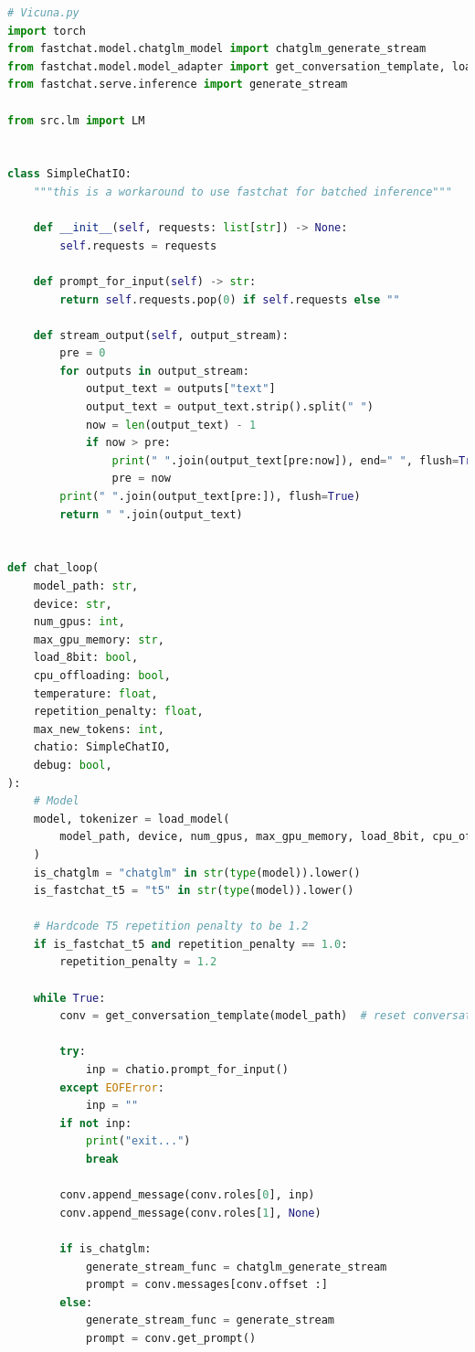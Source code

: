 \documentclass[a4paper,12pt]{article}
\begin{document}
\begin{lstlisting}[language=Python]
# Vicuna.py
import torch
from fastchat.model.chatglm_model import chatglm_generate_stream
from fastchat.model.model_adapter import get_conversation_template, load_model
from fastchat.serve.inference import generate_stream

from src.lm import LM


class SimpleChatIO:
    """this is a workaround to use fastchat for batched inference"""

    def __init__(self, requests: list[str]) -> None:
        self.requests = requests

    def prompt_for_input(self) -> str:
        return self.requests.pop(0) if self.requests else ""

    def stream_output(self, output_stream):
        pre = 0
        for outputs in output_stream:
            output_text = outputs["text"]
            output_text = output_text.strip().split(" ")
            now = len(output_text) - 1
            if now > pre:
                print(" ".join(output_text[pre:now]), end=" ", flush=True)
                pre = now
        print(" ".join(output_text[pre:]), flush=True)
        return " ".join(output_text)


def chat_loop(
    model_path: str,
    device: str,
    num_gpus: int,
    max_gpu_memory: str,
    load_8bit: bool,
    cpu_offloading: bool,
    temperature: float,
    repetition_penalty: float,
    max_new_tokens: int,
    chatio: SimpleChatIO,
    debug: bool,
):
    # Model
    model, tokenizer = load_model(
        model_path, device, num_gpus, max_gpu_memory, load_8bit, cpu_offloading, debug
    )
    is_chatglm = "chatglm" in str(type(model)).lower()
    is_fastchat_t5 = "t5" in str(type(model)).lower()

    # Hardcode T5 repetition penalty to be 1.2
    if is_fastchat_t5 and repetition_penalty == 1.0:
        repetition_penalty = 1.2

    while True:
        conv = get_conversation_template(model_path)  # reset conversation

        try:
            inp = chatio.prompt_for_input()
        except EOFError:
            inp = ""
        if not inp:
            print("exit...")
            break

        conv.append_message(conv.roles[0], inp)
        conv.append_message(conv.roles[1], None)

        if is_chatglm:
            generate_stream_func = chatglm_generate_stream
            prompt = conv.messages[conv.offset :]
        else:
            generate_stream_func = generate_stream
            prompt = conv.get_prompt()


\end{lstlisting}
\end{document}
